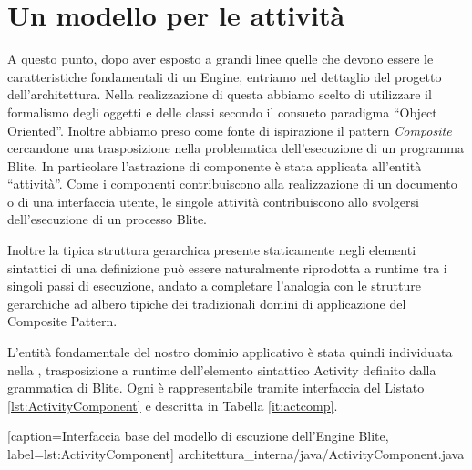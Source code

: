 \section{Un modello per le attività}
A questo punto, dopo aver esposto a grandi linee quelle che devono essere le
caratteristiche fondamentali di un Engine, entriamo nel dettaglio del progetto
dell'architettura. Nella realizzazione di questa abbiamo scelto di utilizzare
il formalismo degli oggetti e delle classi secondo il consueto paradigma
``Object Oriented''. Inoltre abbiamo preso come fonte di
ispirazione il pattern \emph{Composite} \cite{GANGo4} cercandone una
trasposizione nella problematica dell'esecuzione di un programma Blite. In particolare
l'astrazione di componente \`e stata applicata all'entità ``attività''. Come i
componenti contribuiscono alla realizzazione di un documento o di una
interfaccia utente, le singole attività contribuiscono allo svolgersi
dell'esecuzione di un processo Blite.
 
Inoltre la tipica struttura gerarchica presente staticamente negli elementi
sintattici di una definizione può essere naturalmente riprodotta a runtime tra
i singoli passi di esecuzione, andato a completare l'analogia con le strutture
gerarchiche ad albero tipiche dei tradizionali domini di applicazione del
Composite Pattern. 

L'entità fondamentale del nostro dominio applicativo \`e stata quindi
individuata nella , trasposizione a runtime
dell'elemento sintattico Activity definito dalla grammatica di Blite.
Ogni  \`e rappresentabile tramite 
interfaccia del Listato \ref{lst:ActivityComponent} e descritta in Tabella \ref{it:actcomp}.


[caption={Interfaccia base del modello di escuzione dell'Engine Blite},
label=lst:ActivityComponent]
{architettura_interna/java/ActivityComponent.java}

